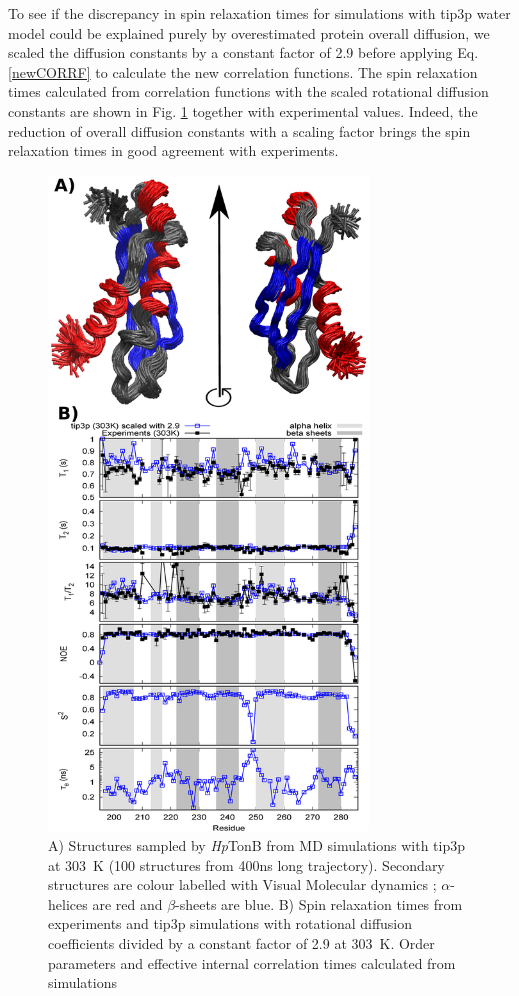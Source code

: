 \documentclass[pre,aps,floatfix,authordate1-4,twocolumn]{revtex4-1}
\begin{document}
To see if the discrepancy in spin relaxation times for simulations with tip3p water model
could be explained purely by overestimated protein overall diffusion,
we scaled the diffusion constants by a constant factor of 2.9 before applying
Eq. \ref{newCORRF} to calculate the new correlation functions. The spin
relaxation times calculated from correlation functions with the scaled
rotational diffusion constants are shown in Fig. \ref{HpTonBrelaxationDATAscaled}
together with experimental values. Indeed, the reduction of overall diffusion
constants with a scaling factor brings the spin relaxation times in good agreement with
experiments.
\begin{figure}[!h]
  \includegraphics[width=8.5cm]{../Figs/RELdataHpTonB2.eps}%
  \caption{A) Structures sampled by {\it Hp}TonB from MD simulations with tip3p at 303~K
    (100 structures from 400ns long trajectory). Secondary structures
    are colour labelled with Visual Molecular dynamics \cite{frishman95,humphrey96};
    $\alpha$-helices are red and $\beta$-sheets are blue.
    B) Spin relaxation times from experiments and tip3p
    simulations with rotational diffusion coefficients divided by a
    constant factor of 2.9 at 303~K. Order parameters and effective internal correlation
    times calculated from simulations
    \label{HpTonBrelaxationDATAscaled}}%
\end{figure}
\end{document}
